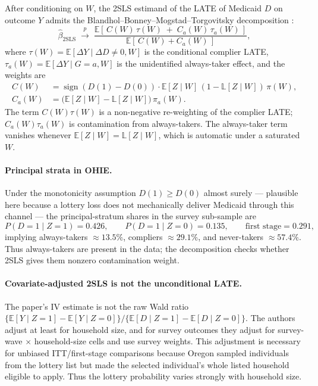 \documentclass[11pt]{article}
\newcommand{\E}{\mathbb{E}}
\newcommand{\Lproj}{\mathbb{L}}
\begin{document}
After conditioning on $W$, the 2SLS estimand of the LATE of Medicaid
$D$ on outcome $Y$ admits the
Blandhol--Bonney--Mogstad--Torgovitsky decomposition
\citep{BBMT2022}:
\begin{equation}\label{eq:bbmt}
    \hat\beta_{\text{2SLS}} \;\xrightarrow{p}\;
    \frac{\E\!\left[\, C(W)\,\tau(W) \;+\; C_{a}(W)\,\tau_{a}(W)\,\right]}
         {\E\!\left[\, C(W) + C_{a}(W)\,\right]},
\end{equation}
where $\tau(W) = \E[\Delta Y\mid \Delta D\ne 0,W]$ is the conditional
complier LATE, $\tau_{a}(W)=\E[\Delta Y\mid G=a,W]$ is the
unidentified always-taker effect, and the weights are
\begin{align*}
    C(W)   &= \operatorname{sign}(D(1)-D(0))\cdot
              \E[Z\mid W]\,(1 - \Lproj[Z\mid W])\,\pi(W),\\[2pt]
    C_{a}(W) &= \big(\E[Z\mid W] - \Lproj[Z\mid W]\big)\,\pi_{a}(W).
\end{align*}
The term $C(W)\tau(W)$ is a non-negative re-weighting of the
complier LATE; $C_{a}(W)\tau_{a}(W)$ is contamination from
always-takers. The always-taker term vanishes whenever
$\E[Z\mid W] = \Lproj[Z\mid W]$, which is automatic under a saturated
$W$.

\paragraph{Principal strata in OHIE.}
Under the monotonicity assumption $D(1)\ge D(0)$ almost surely ---
plausible here because a lottery loss does not mechanically deliver
Medicaid through this channel --- the principal-stratum shares in the
survey sub-sample are
\[
    P(D=1\mid Z=1) = 0.426,\qquad
    P(D=1\mid Z=0) = 0.135,\qquad
    \text{first stage} = 0.291,
\]
implying always-takers $\approx 13.5\%$, compliers $\approx 29.1\%$,
and never-takers $\approx 57.4\%$. Thus always-takers are present in
the data; the decomposition checks whether 2SLS gives them nonzero
contamination weight.

\paragraph{Covariate-adjusted 2SLS is not the unconditional LATE.}
The paper's IV estimate is not the raw Wald ratio
$\{\E[Y\mid Z=1]-\E[Y\mid Z=0]\}/\{\E[D\mid Z=1]-\E[D\mid Z=0]\}$.
The authors adjust at least for household size, and for survey outcomes
they adjust for survey-wave $\times$ household-size cells and use survey
weights. This adjustment is necessary for unbiased ITT/first-stage
comparisons because Oregon sampled individuals from the lottery list but
made the selected individual's whole listed household eligible to apply.
Thus the lottery probability varies strongly with household size.
\end{document}
